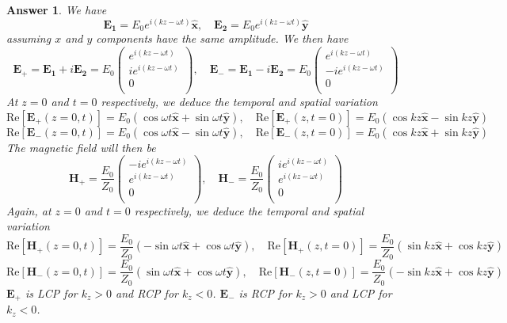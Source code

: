\documentclass[a4paper]{article}
\newtheorem{ans}{Answer}
\theoremstyle{new}
\begin{document}
\begin{ans}
We have
$$\mathbf{E_1}=E_0e^{i(kz-\omega t)}\mathbf{\hat{x}},\quad\mathbf{E_2}=E_0e^{i(kz-\omega t)}\mathbf{\hat{y}}$$
assuming $x$ and $y$ components have the same amplitude. We then have
$$\mathbf{E_+}=\mathbf{E_1}+i\mathbf{E_2}=E_0\begin{pmatrix}e^{i(kz-\omega t)}\\ie^{i(kz-\omega t)}\\0\\\end{pmatrix},\quad\mathbf{E_-}=\mathbf{E_1}-i\mathbf{E_2}=E_0\begin{pmatrix}e^{i(kz-\omega t)}\\-ie^{i(kz-\omega t)}\\0\\\end{pmatrix}$$
At $z=0$ and $t=0$ respectively, we deduce the temporal and spatial variation
$$\text{Re}[\mathbf{E_+}(z=0,t)]=E_0(\cos\omega t\mathbf{\hat{x}}+\sin\omega t\mathbf{\hat{y}}),\quad\text{Re}[\mathbf{E_+}(z,t=0)]=E_0(\cos kz\mathbf{\hat{x}}-\sin kz\mathbf{\hat{y}})$$
$$\text{Re}[\mathbf{E_-}(z=0,t)]=E_0(\cos\omega t\mathbf{\hat{x}}-\sin\omega t\mathbf{\hat{y}}),\quad\text{Re}[\mathbf{E_-}(z,t=0)]=E_0(\cos kz\mathbf{\hat{x}}+\sin kz\mathbf{\hat{y}})$$
The magnetic field will then be
$$\mathbf{H_+}=\frac{E_0}{Z_0}\begin{pmatrix}-ie^{i(kz-\omega t)}\\e^{i(kz-\omega t)}\\0\\\end{pmatrix},\quad\mathbf{H_-}=\frac{E_0}{Z_0}\begin{pmatrix}ie^{i(kz-\omega t)}\\e^{i(kz-\omega t)}\\0\\\end{pmatrix}$$
Again, at $z=0$ and $t=0$ respectively, we deduce the temporal and spatial variation
$$\text{Re}[\mathbf{H_+}(z=0,t)]=\frac{E_0}{Z_0}(-\sin\omega t\mathbf{\hat{x}}+\cos\omega t\mathbf{\hat{y}}),\quad\text{Re}[\mathbf{H_+}(z,t=0)]=\frac{E_0}{Z_0}(\sin kz\mathbf{\hat{x}}+\cos kz\mathbf{\hat{y}})$$
$$\text{Re}[\mathbf{H_-}(z=0,t)]=\frac{E_0}{Z_0}(\sin\omega t\mathbf{\hat{x}}+\cos\omega t\mathbf{\hat{y}}),\quad\text{Re}[\mathbf{H_-}(z,t=0)]=\frac{E_0}{Z_0}(-\sin kz\mathbf{\hat{x}}+\cos kz\mathbf{\hat{y}})$$
$\mathbf{E_+}$ is LCP for $k_z>0$ and RCP for $k_z<0$. $\mathbf{E_-}$ is RCP for $k_z>0$ and LCP for $k_z<0$.
\end{ans}
\end{document}
